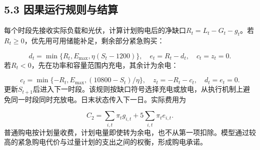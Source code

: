 \documentclass[UTF8,a4paper,zihao=-4,fontset=windows]{ctexart}
\begin{document}
\subsection{5.3 因果运行规则与结算}
每个时段先接收实际负载和光伏，计算计划购电后的净缺口$R_t=L_t-G_t-g_t$。若$R_t\ge0$，优先用可用储能补足，剩余部分紧急购买：
\par
\begin{equation}
d_t=\min\{R_t,E_{\max},\eta(S_t-1200)\},\quad e_t=R_t-d_t,\quad c_t=z_t=0. \tag{9}
\end{equation}
若$R_t<0$，先在功率和容量范围内充电，其余计为余电：
\par
\begin{equation}
c_t=\min\{-R_t,E_{\max},(10800-S_t)/\eta\},\quad z_t=-R_t-c_t,\quad d_t=e_t=0. \tag{10}
\end{equation}
更新$S_{t+1}$后进入下一时段。该规则按缺口符号选择充电或放电，从执行机制上避免同一时段同时充放电。日末状态传入下一日。实际费用为
\par
\begin{equation}
C_2=\sum_{i,t}\pi_tg_{i,t}+5\sum_{i,t}\pi_te_{i,t}. \tag{11}
\end{equation}
普通购电按计划量收费，计划电量即使转为余电，也不从第一项扣除。模型通过较高的紧急购电代价与过量计划的支出之间的权衡，形成购电承诺。
\par
\end{document}
